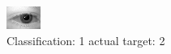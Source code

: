 \begin{figure}[h!]
\begin{center}
\includegraphics[width=0.60\columnwidth]{figures/ID476_class_1_target_2.png}
\end{center}
\caption{ Classification: 1 actual target: 2}
\label{fig:ID476_class_1_target_2}
\end{figure}
